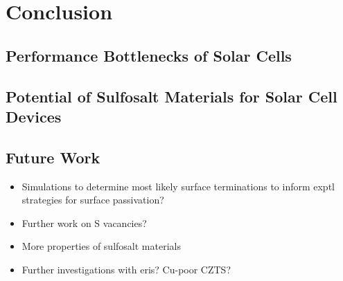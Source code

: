 
\chapter{Conclusion}

\label{ch:conclusions}

\section{Performance Bottlenecks of  \CZTS Solar Cells}
\section{Potential of Sulfosalt Materials for Solar Cell Devices}

\section{Future Work}

\begin{itemize}
\item Simulations to determine most likely surface terminations to inform exptl strategies for surface passivation?
\item Further work on S vacancies?
\item More properties of sulfosalt materials
\item Further investigations with eris? Cu-poor CZTS?
\end{itemize}

 